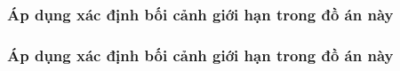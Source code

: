 \subsubsection{Áp dụng xác định bối cảnh giới hạn trong đồ án này}

\subsubsection{Áp dụng xác định bối cảnh giới hạn trong đồ án này}









